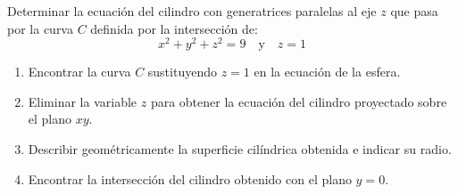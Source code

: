 Determinar la ecuación del cilindro con generatrices paralelas al eje $z$ que pasa por la curva $C$ definida por la intersección de:
\[
x^2 + y^2 + z^2 = 9 \quad \text{y} \quad z = 1
\]

\begin{enumerate}
    \item Encontrar la curva $C$ sustituyendo $z = 1$ en la ecuación de la esfera.
    \item Eliminar la variable $z$ para obtener la ecuación del cilindro proyectado sobre el plano $xy$.
    \item Describir geométricamente la superficie cilíndrica obtenida e indicar su radio.
    \item Encontrar la intersección del cilindro obtenido con el plano $y = 0$.
\end{enumerate}
